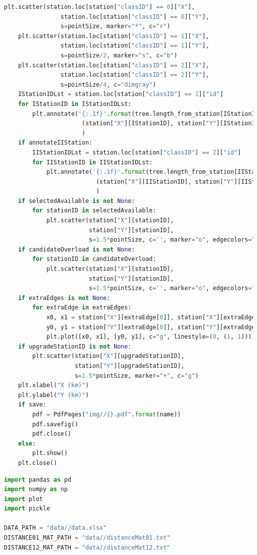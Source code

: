 \documentclass{cumcmthesis}
\begin{document}
\begin{appendices}
\begin{lstlisting}[language=python]
    plt.scatter(station.loc[station["classID"] == 0]["X"],
                station.loc[station["classID"] == 0]["Y"],
                s=pointSize, marker="*", c="r")
    plt.scatter(station.loc[station["classID"] == 1]["X"],
                station.loc[station["classID"] == 1]["Y"],
                s=pointSize/2, marker="s", c="b")
    plt.scatter(station.loc[station["classID"] == 2]["X"],
                station.loc[station["classID"] == 2]["Y"],
                s=pointSize/4, c="dimgray")
    IStationIDLst = station.loc[station["classID"] == 1]["id"]
    for IStationID in IStationIDLst:
        plt.annotate('{:.1f}'.format(tree.length_from_station[IStationID]),
                      (station["X"][IStationID], station["Y"][IStationID]), fontsize=8
                      )
    if annotateIIStation:
        IIStationIDLst = station.loc[station["classID"] == 2]["id"]
        for IIStationID in IIStationIDLst:
            plt.annotate('{:.1f}'.format(tree.length_from_station[IIStationID]),
                          (station["X"][IIStationID], station["Y"][IIStationID]), fontsize=5
                          )
    if selectedAvailable is not None:
        for stationID in selectedAvailable:
            plt.scatter(station["X"][stationID],
                        station["Y"][stationID],
                        s=1.5*pointSize, c='', marker="o", edgecolors="g")
    if candidateOverload is not None:
        for stationID in candidateOverload:
            plt.scatter(station["X"][stationID],
                        station["Y"][stationID],
                        s=1.5*pointSize, c='', marker="o", edgecolors="r")
    if extraEdges is not None:
        for extraEdge in extraEdges:
            x0, x1 = station["X"][extraEdge[0]], station["X"][extraEdge[1]]
            y0, y1 = station["Y"][extraEdge[0]], station["Y"][extraEdge[1]]
            plt.plot([x0, x1], [y0, y1], c="g", linestyle=(0, (1, 1)))
    if upgradeStationID is not None:
        plt.scatter(station["X"][upgradeStationID],
                    station["Y"][upgradeStationID],
                    s=1.5*pointSize, marker="+", c="g")
    plt.xlabel("X (km)")
    plt.ylabel("Y (km)")
    if save:
        pdf = PdfPages("img//{}.pdf".format(name))
        pdf.savefig()
        pdf.close()
    else:
        plt.show()
    plt.close()
  \end{lstlisting}
  \begin{lstlisting}[language=python]
import pandas as pd
import numpy as np
import plot
import pickle

DATA_PATH = "data//data.xlsx"
DISTANCE01_MAT_PATH = "data//distanceMat01.txt"
DISTANCE12_MAT_PATH = "data//distanceMat12.txt"



\end{lstlisting}
\end{appendices}
\end{document}
